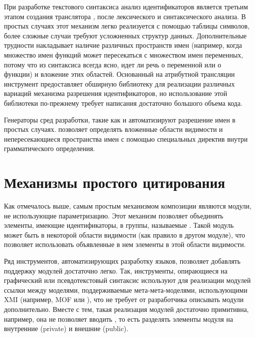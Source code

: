 При разработке текстового синтаксиса анализ идентификаторов является третьим этапом создания транслятора \cite{???}, после лексического и синтаксического анализа. В простых случаях этот механизм легко реализуется с помощью таблицы символов, более сложные случаи требуют усложненных структур данных. Дополнительные трудности накладывает наличие различных пространств имен (например, когда множество имен функций может пересекаться с множеством имен переменных, потому что из синтаксиса всегда ясно, идет ли речь о переменной или о функции) и вложение этих областей. Основанный на атрибутной трансляции инструмент  \cite{???} предоставляет обширную библиотеку для реализации различных вариаций механизма разрешения идентификаторов, но использование этой библиотеки по-прежнему требует написания достаточно большого объема кода.

Генераторы сред разработки, такие как  \cite{???} и  \cite{???} автоматизируют разрешение имен в простых случаях.  позволяет определять вложенные области видимости и непересекающиеся пространства имен с помощью специальных директив внутри грамматического определения. 

\section{Механизмы простого цитирования}

Как отмечалось выше, самым простым механизмом композиции являются модули, не использующие параметризацию. Этот механизм позволяет объединять элементы, имеющие идентификаторы, в группы, называемые . Такой модуль может быть  в некоторой области видимости (как правило в другом модуле), что позволяет использовать объявленные в нем элементы в этой области видимости.

Ряд инструментов, автоматизирующих разработку языков, позволяет добавлять поддержку модулей достаточно легко. Так, инструменты, опирающиеся на графический или псевдотекстовый синтаксис \cite{EMF Fujaba MPS} используют для реализации модулей ссылки между моделями, поддерживаемые мета-мета-моделями, использующими XMI \cite{XMI} (например, MOF или ), что не требует от разработчика описывать модули дополнительно. Вместе с тем, такая реализация модулей достаточно примитивна, например, она не позволяет вводить , то есть разделять элементы модуля на внутренние (private) и внешние (public).

